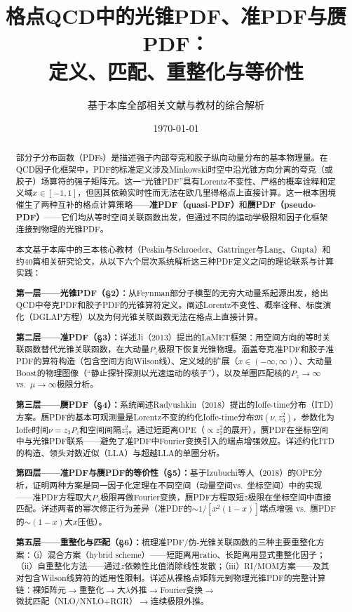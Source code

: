 \documentclass[12pt,a4paper]{ctexart}
\title{\heiti 格点QCD中的光锥PDF、准PDF与赝PDF：\\
定义、匹配、重整化与等价性}
\author{基于本库全部相关文献与教材的综合解析}
\date{\today}
\theoremstyle{definition}
\begin{document}
\maketitle

\begin{abstract}
\noindent
部分子分布函数（PDFs）是描述强子内部夸克和胶子纵向动量分布的基本物理量。在QCD因子化框架中，PDF的标准定义涉及Minkowski时空中沿光锥方向分离的夸克（或胶子）场算符的强子矩阵元。这一``光锥PDF''具有Lorentz不变性、严格的概率诠释和定义域$x\in[-1,1]$，但因其依赖实时性而无法在欧几里得格点上直接计算。这一根本困境催生了两种互补的格点计算策略——\textbf{准PDF（quasi-PDF）}和\textbf{赝PDF（pseudo-PDF）}——它们均从等时空间关联函数出发，但通过不同的运动学极限和因子化框架连接到物理的光锥PDF。

本文基于本库中的三本核心教材（Peskin与Schroeder、Gattringer与Lang、Gupta）和约40篇相关研究论文，从以下六个层次系统解析这三种PDF定义之间的理论联系与计算实践：

\textbf{第一层——光锥PDF（§2）：}从Feynman部分子模型的无穷大动量系起源出发，给出QCD中夸克PDF和胶子PDF的光锥算符定义。阐述Lorentz不变性、概率诠释、标度演化（DGLAP方程）以及为何光锥关联函数无法在格点上直接计算。

\textbf{第二层——准PDF（§3）：}详述Ji（2013）提出的LaMET框架：用空间方向的等时关联函数替代光锥关联函数，在大动量$P_z$极限下恢复光锥物理。涵盖夸克准PDF和胶子准PDF的算符构造（包含空间方向Wilson线）、定义域的扩展（$x\in(-\infty,\infty)$）、大动量Boost的物理图像（``静止探针探测以光速运动的核子''），以及单圈匹配核的$P_z\to\infty$ vs.\ $\mu\to\infty$极限分析。

\textbf{第三层——赝PDF（§4）：}系统阐述Radyushkin（2018）提出的Ioffe-time分布（ITD）方案。赝PDF的基本可观测量是Lorentz不变的约化Ioffe-time分布$\mathfrak{M}(\nu, z_3^2)$，参数化为Ioffe时间$\nu = z_3 P_z$和空间间隔$z_3^2$。通过短距离OPE（$\propto z_3^2$的展开），赝PDF在坐标空间中与光锥PDF联系——避免了准PDF中Fourier变换引入的端点增强效应。详述约化ITD的构造、领头对数近似（LLA）与超越LLA的单圈分析。

\textbf{第四层——准PDF与赝PDF的等价性（§5）：}基于Izubuchi等人（2018）的OPE分析，证明两种方案是同一因子化定理在不同空间（动量空间vs.\ 坐标空间）中的实现——准PDF方程取大$P_z$极限再做Fourier变换，赝PDF方程取短$z$极限在坐标空间中直接匹配。详述两者的幂次修正行为差异（准PDF的$\sim 1/[x^2(1-x)]$端点增强 vs.\ 赝PDF的$\sim(1-x)$大$x$压低）。

\textbf{第五层——重整化与匹配（§6）：}梳理准PDF/伪-光锥关联函数的三种主要重整化方案：（i）混合方案（hybrid scheme）——短距离用ratio、长距离用显式重整化因子；（ii）自重整化方法——通过$z$依赖性比值消除线性发散；（iii）RI/MOM方案——及其对包含Wilson线算符的适用性限制。详述从裸格点矩阵元到物理光锥PDF的完整计算链：裸矩阵元$\to$重整化$\to$大$\lambda$外推$\to$Fourier变换$\to$微扰匹配（NLO/NNLO+RGR）$\to$连续极限外推。


\end{abstract}
\end{document}
